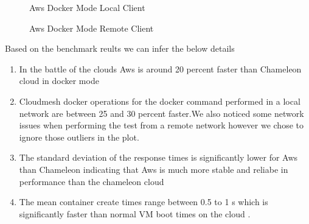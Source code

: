 \documentclass[9pt,twocolumn,twoside]{../../styles/osajnl}
\begin{document}
\begin{figure}[h]
\centering
{}
\caption{Aws Docker Mode Local Client}
\label{fig:Aws-Docker-Mode-Local-Client}
\end{figure}


\begin{figure}[h]
\centering
{}
\caption{Aws Docker Mode Remote Client}
\label{fig:Aws-Docker-Mode-Remote-Client}
\end{figure}


Based on the benchmark reults we can infer the below details
\begin{enumerate}
\item  In the battle of the clouds Aws is around 20 percent faster than Chameleon cloud in docker mode
\item  Cloudmesh docker operations for the docker command performed in a local network are between
25 and 30  percent faster.We also noticed some network issues when performing the test from a
remote network however we chose to ignore those outliers in the plot.
\item The standard deviation of the response times is significantly lower for Aws than Chameleon indicating 
that Aws is much more stable and reliabe in performance than the chameleon cloud
\item The mean container create times range between 0.5 to 1 s which is significantly faster than normal VM 
boot times on the cloud .
\end{enumerate}
\end{document}
